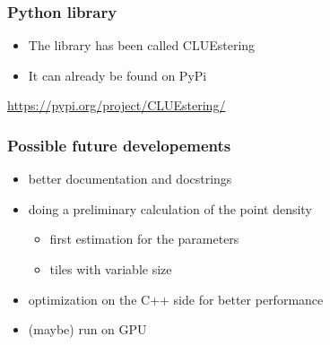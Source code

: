 \documentclass{beamer}
\begin{document}
\begin{frame}
\frametitle{Python library}
\begin{itemize}
	\item The library has been called CLUEstering
	\item It can already be found on PyPi
\end{itemize}
\begin{center}
	\url{https://pypi.org/project/CLUEstering/}
\end{center}
\end{frame}
\begin{frame}
\frametitle{Possible future developements}
\begin{itemize}
	\item better documentation and docstrings
	\item doing a preliminary calculation of the point density
		\begin{itemize}
			\item first estimation for the parameters
			\item tiles with variable size
		\end{itemize}
	\item optimization on the C++ side for better performance
	\item (maybe) run on GPU
\end{itemize}
\end{frame}
\end{document}

